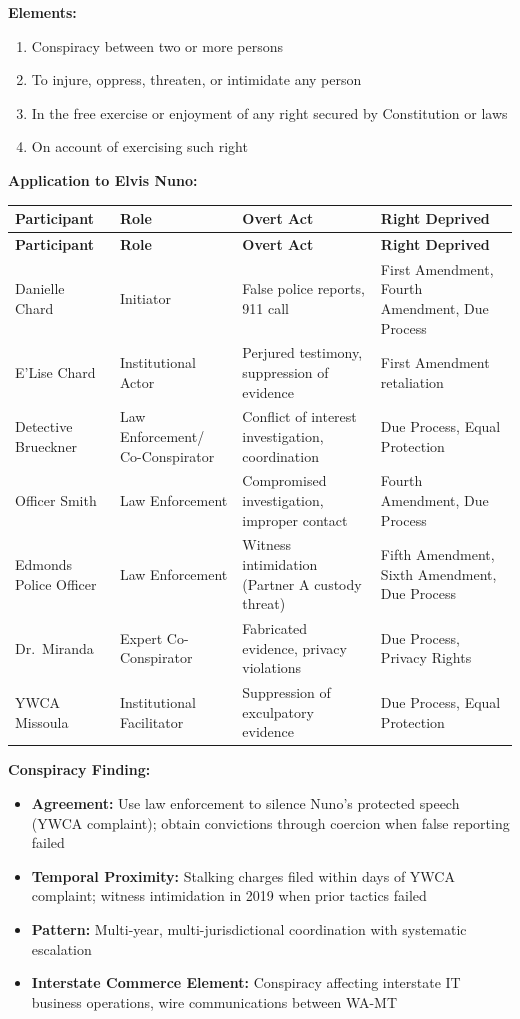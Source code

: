 \documentclass[11pt, letterpaper]{article}
\begin{document}
\textbf{Elements:}
\begin{enumerate}[leftmargin=*,itemsep=2pt]
    \item Conspiracy between two or more persons
    \item To injure, oppress, threaten, or intimidate any person
    \item In the free exercise or enjoyment of any right secured by Constitution or laws
    \item On account of exercising such right
\end{enumerate}

\textbf{Application to Elvis Nuno:}

\begin{center}
\begin{longtable}{|p{1.1in}|p{1.1in}|p{1.5in}|p{1.7in}|}
\hline
\textbf{Participant} & \textbf{Role} & \textbf{Overt Act} & \textbf{Right Deprived} \\
\hline
\endfirsthead
\hline
\textbf{Participant} & \textbf{Role} & \textbf{Overt Act} & \textbf{Right Deprived} \\
\hline
\endhead
Danielle Chard & Initiator & False police reports, 911 call & First Amendment, Fourth Amendment, Due Process \\
\hline
E'Lise Chard & Institutional Actor & Perjured testimony, suppression of evidence & First Amendment retaliation \\
\hline
Detective Brueckner & Law Enforcement/ Co-Conspirator & Conflict of interest investigation, coordination & Due Process, Equal Protection \\
\hline
Officer Smith & Law Enforcement & Compromised investigation, improper contact & Fourth Amendment, Due Process \\
\hline
Edmonds Police Officer & Law Enforcement & Witness intimidation (Partner A custody threat) & Fifth Amendment, Sixth Amendment, Due Process \\
\hline
Dr.\ Miranda & Expert Co-Conspirator & Fabricated evidence, privacy violations & Due Process, Privacy Rights \\
\hline
YWCA Missoula & Institutional Facilitator & Suppression of exculpatory evidence & Due Process, Equal Protection \\
\hline
\end{longtable}
\end{center}

\textbf{Conspiracy Finding:}
\begin{itemize}[leftmargin=*,itemsep=2pt]
    \item \textbf{Agreement:} Use law enforcement to silence Nuno's protected speech (YWCA complaint); obtain convictions through coercion when false reporting failed
    \item \textbf{Temporal Proximity:} Stalking charges filed within days of YWCA complaint; witness intimidation in 2019 when prior tactics failed
    \item \textbf{Pattern:} Multi-year, multi-jurisdictional coordination with systematic escalation
    \item \textbf{Interstate Commerce Element:} Conspiracy affecting interstate IT business operations, wire communications between WA-MT
\end{itemize}
\end{document}
